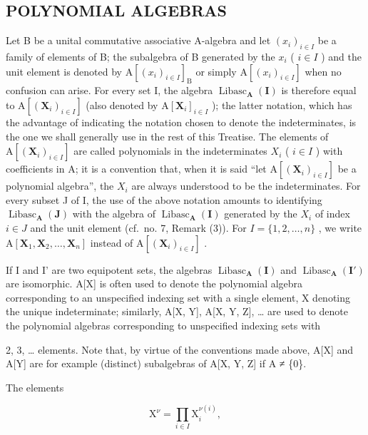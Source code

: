 \subsection{POLYNOMIAL ALGEBRAS}

Let B be a unital commutative associative A-algebra and let \((x_{i})_{i\in I}\) be a family of elements of B; the subalgebra of B generated by the \(x_{i}\) ( \(i\in I\) ) and the unit element is denoted by \(\mathrm{A}[(x_{i})_{i\in I}]_{\mathrm{B}}\) or simply \(\mathrm{A}[(x_{i})_{i\in I}]\) when no confusion can arise. For every set I, the algebra \(\operatorname{Libasc}_{\mathbf{A}}(\mathbf{I})\) is therefore equal to \(\mathrm{A}[(\mathbf{X}_{i})_{i\in I}]\) (also denoted by \(\mathrm{A}[\mathbf{X}_{i}]_{i\in I}\) ); the latter notation, which has the advantage of indicating the notation chosen to denote the indeterminates, is the one we shall generally use in the rest of this Treatise. The elements of \(\mathrm{A}[(\mathbf{X}_{i})_{i\in I}]\) are called polynomials in the indeterminates \(X_{i}\) ( \(i\in I\) ) with coefficients in A; it is a convention that, when it is said ``let \(\mathrm{A}[(\mathbf{X}_{i})_{i\in I}]\) be a polynomial algebra'', the \(X_{i}\) are always understood to be the indeterminates. For every subset J of I, the use of the above notation amounts to identifying \(\operatorname{Libasc}_{\mathbf{A}}(\mathbf{J})\) with the algebra of \(\operatorname{Libasc}_{\mathbf{A}}(\mathbf{I})\) generated by the \(X_{i}\) of index \(i\in J\) and the unit element (cf.~no. 7, Remark (3)). For \(I=\{1,2,\ldots,n\}\) , we write \(\mathrm{A}[\mathbf{X}_{1},\mathbf{X}_{2},\ldots,\mathbf{X}_{n}]\) instead of \(\mathrm{A}[(\mathbf{X}_{i})_{i\in I}]\) .

If I and I' are two equipotent sets, the algebras \(\operatorname{Libasc}_{\mathbf{A}}(\mathbf{I})\) and \(\operatorname{Libasc}_{\mathbf{A}}(\mathbf{I}')\) are isomorphic. A{[}X{]} is often used to denote the polynomial algebra corresponding to an unspecified indexing set with a single element, X denoting the unique indeterminate; similarly, A{[}X, Y{]}, A{[}X, Y, Z{]}, \ldots{} are used to denote the polynomial algebras corresponding to unspecified indexing sets with

2, 3, \ldots{} elements. Note that, by virtue of the conventions made above, A{[}X{]} and A{[}Y{]} are for example (distinct) subalgebras of A{[}X, Y, Z{]} if A ≠ \{0\}.

The elements

\[
\mathrm{X} ^ {\nu} = \prod_ {i \in I} \mathrm{X} _ {i} ^ {\nu (i)},
\]

